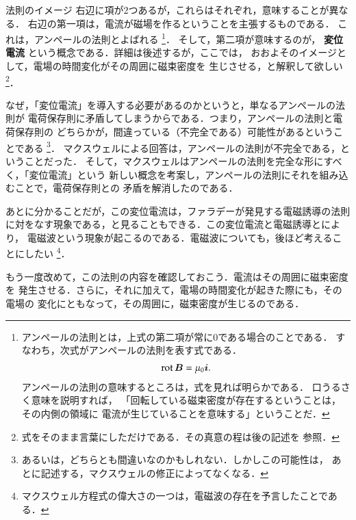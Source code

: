             \begin{mysmallsec}{法則のイメージ}
                右辺に項が2つあるが，これらはそれぞれ，意味することが異なる．
                右辺の第一項は，電流が磁場を作るということを主張するものである．
                これは，アンペールの法則とよばれる
                    \footnote{
                        アンペールの法則とは，上式の第二項が常に0である場合のことである．
                        すなわち，次式がアンペールの法則を表す式である．
                            \begin{align}
                                \mathrm{rot}\, \boldsymbol{B} = \mu_{0}\boldsymbol{i}.
                            \end{align}
                        アンペールの法則の意味するところは，式を見れば明らかである．
                        口うるさく意味を説明すれば，
                        「回転している磁束密度が存在するということは，その内側の領域に
                        電流が生じていることを意味する」ということだ．
                    }．
                そして，第二項が意味するのが，
                \textbf{変位電流} という概念である．詳細は後述するが，ここでは，
                おおよそのイメージとして，電場の時間変化がその周囲に磁束密度を
                生じさせる，と解釈して欲しい
                    \footnote{
                        式をそのまま言葉にしただけである．その真意の程は後の記述を
                        参照．
                    }．

                なぜ，「変位電流」を導入する必要があるのかというと，単なるアンペールの法則が
                電荷保存則に矛盾してしまうからである．つまり，アンペールの法則と電荷保存則の
                どちらかが，間違っている（不完全である）可能性があるということである
                    \footnote{
                        あるいは，どちらとも間違いなのかもしれない．しかしこの可能性は，
                        あとに記述する，マクスウェルの修正によってなくなる．
                    }．
                マクスウェルによる回答は，アンペールの法則が不完全である，ということだった．
                そして，マクスウェルはアンペールの法則を完全な形にすべく，「変位電流」という
                新しい概念を考案し，アンペールの法則にそれを組み込むことで，電荷保存則との
                矛盾を解消したのである．

                あとに分かることだが，この変位電流は，ファラデーが発見する電磁誘導の法則
                に対をなす現象である，と見ることもできる．この変位電流と電磁誘導とにより，
                電磁波という現象が起こるのである．電磁波についても，後ほど考えることにしたい
                    \footnote{
                        マクスウェル方程式の偉大さの一つは，電磁波の存在を予言したことである．
                    }．

                もう一度改めて，この法則の内容を確認しておこう．電流はその周囲に磁束密度を
                発生させる．さらに，それに加えて，電場の時間変化が起きた際にも，その電場の
                変化にともなって，その周囲に，磁束密度が生じるのである．
            \end{mysmallsec}

